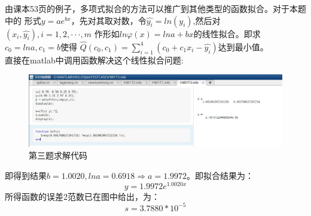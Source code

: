 \documentclass[12pt,a4paper,utf8]{ctexart}
\begin{document}
\begin{enumerate}
    \quad \quad 由课本53页的例子，多项式拟合的方法可以推广到其他类型的函数拟合。对于本题中的
    形式$y=ae^{bx}$，先对其取对数，令$\hat{y_{i}}=ln(y_i)$,然后对$(x_{i},\hat{y_{i}}),i=1,2,···,m$
    作形如$ln\varphi(x)=ln a+bx$的线性拟合。即求$c_{0}=ln a,c_{1}=b$使得
    $\hat{Q}(c_{0},c_{1})=\sum _{i=1}^{4}(c_{0}+c_{1}x_{i}-\hat{y_{i}})$达到最小值。\\
    \quad \quad 直接在matlab中调用函数解决这个线性拟合问题:\\

    \begin{figure}[h]
        \centering
        \includegraphics[width=1\textwidth]{T3.JPG}
        \caption{第三题求解代码}
    \end{figure}

    即得到结果$b=1.0020, ln a=0.6918 \Rightarrow a=1.9972$。即拟合结果为：
    \begin{equation}
        y=1.9972e^{1.0020x}
    \end{equation}
    \quad \quad 所得函数的误差2范数已在图中给出，为：
    \begin{equation}
        s=3.7880*10^{-5}
    \end{equation}





\end{enumerate}
\end{document}
